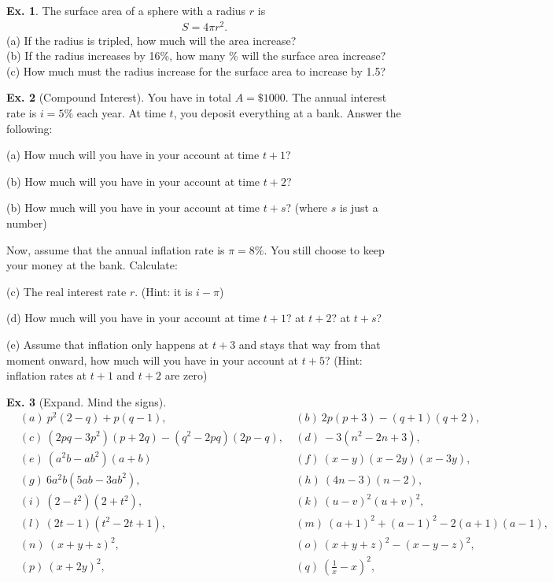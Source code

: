 \documentclass[10pt,a4paper]{book}
\theoremstyle{definition}\newtheorem{definition}{Definition}
\theoremstyle{definition}\newtheorem{fact}{Fact}
\theoremstyle{definition}\newtheorem{ex}{Ex.}
\theoremstyle{definition}\newtheorem{project}{Project}
\theoremstyle{definition}\newtheorem{problem}{Problem}
\theoremstyle{definition}\newtheorem{example}{Example}
\numberwithin{theorem}{chapter}
\numberwithin{corollary}{chapter}
\numberwithin{assumption}{chapter}
\numberwithin{definition}{chapter}
\numberwithin{prop}{chapter}
\numberwithin{notation}{chapter}
\numberwithin{problem}{chapter}
\numberwithin{example}{chapter}
\numberwithin{fact}{chapter}
\numberwithin{ex}{chapter}
\begin{document}
	\begin{ex}
		The surface area of a sphere with a radius $r$ is
		\begin{align*}
			S = 4\pi r^2. 
		\end{align*}
		(a) If the radius is tripled, how much will the area increase? \\
		(b) If the radius increases by 16\%, how many \% will the surface area increase? \\
		(c) How much must the radius increase for the surface area to increase by 1.5?
	\end{ex}
	
	\begin{ex}[Compound Interest] You have in total $A=\$1000$. The annual interest rate is $i =  5\%$ each year. At time $t$, you deposit everything at a bank. Answer the following:
		
		(a) How much will you have in your account at time $t+1$?
		
		(b) How much will you have in your account at time $t+2$?
		
		(b) How much will you have in your account at time $t+s$? (where $s$ is just a number)
		
		Now, assume that the annual inflation rate is $\pi = 8\%$. You still choose to keep your money at the bank. Calculate:
		
		(c) The real interest rate $r$. (Hint: it is $i-\pi$)
		
		(d) How much will you have in your account at time $t+1$? at $t+2$? at $t+s$?
		
		(e) Assume that inflation only happens at $t+3$ and stays that way from that moment onward, how much will you have in your account at $t+5$? (Hint: inflation rates at $t+1$ and $t+2$ are zero)
	\end{ex}
	
	\begin{ex}[Expand. Mind the signs]
		\begin{align*}
			& (a) \ p^2(2-q) + p(q-1),                      
			& (b) \ 2p(p + 3) - (q+1)(q+2),                 \\
			& (c) \ (2pq - 3p^2)(p+2q) - (q^2-2pq)(2p-q), \ 
			& (d) \ -3(n^2 - 2n + 3),                       \\
			& (e) \ (a^2 b - ab^2)(a+b) \                   
			& (f) \ (x-y)(x-2y)(x-3y),                      \\
			& (g) \ 6a^2 b (5 ab - 3 ab^2),                 
			& (h) \ (4n - 3)(n - 2),                        \\
			& (i) \ (2-t^2)(2+t^2), \                       
			& (k) \ (u-v)^2 (u+v)^2,                        \\
			& (l) \ (2t - 1)(t^2 - 2t + 1),                 
			& (m) \ (a+1)^2 + (a-1)^2 - 2(a+1)(a-1),        \\
			& (n) \ (x+y+z)^2,                              
			& (o) \ (x+y+z)^2 - (x-y-z)^2,                  \\
			& (p) \ (x + 2y)^2,                             
			& (q) \ \left( \frac{1}{x} - x \right)^2,       \\
		\end{align*}
	\end{ex}
	
\end{document}
